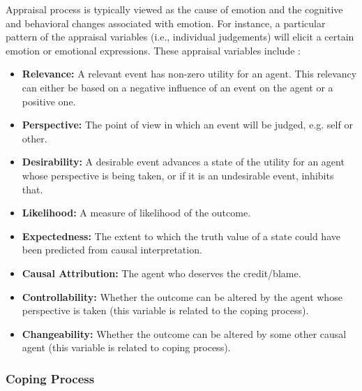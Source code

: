 \documentclass[12pt]{report}
\begin{document}
Appraisal process is typically viewed as the cause of emotion and the cognitive
and behavioral changes associated with emotion. For instance, a particular
pattern of the appraisal variables (i.e., individual judgements) will elicit a
certain emotion or emotional expressions. These appraisal variables include
\cite{marsella:ema-process-model}:\\

\begin{itemize}
  \item \textbf{Relevance:} A relevant event has non-zero utility for an agent.
  This relevancy can either be based on a negative influence of an event on the
  agent or a positive one.
  
  \item \textbf{Perspective:} The point of view in which an event will be
  judged, e.g. self or other.
  
  \item \textbf{Desirability:} A desirable event advances a state of the utility
  for an agent whose perspective is being taken, or if it is an
  undesirable event, inhibits that.
  
  \item \textbf{Likelihood:} A measure of likelihood of the outcome.
  
  \item \textbf{Expectedness:} The extent to which the truth value of a state
  could have been predicted from causal interpretation.
  
  \item \textbf{Causal Attribution:} The agent who deserves the credit/blame.
  
  \item \textbf{Controllability:} Whether the outcome can be altered by the
  agent whose perspective is taken (this variable is related to the coping
  process).
  
  \item \textbf{Changeability:} Whether the outcome can be altered by some other
  causal agent (this variable is related to coping process).
\end{itemize}

\subsubsection{Coping Process}
\label{sec:coping-process}
\end{document}
